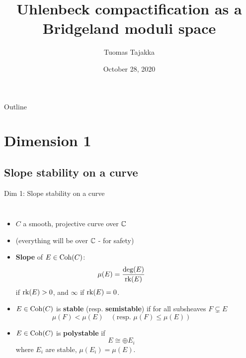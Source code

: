 \documentclass[8pt,handout]{beamer} %
\title{Uhlenbeck compactification as a Bridgeland moduli space}
\author{Tuomas Tajakka}
\institute{University of Washington}
\date{October 28, 2020}
\begin{document}
\begin{frame}
    \titlepage
\end{frame}

\begin{frame}{Outline}
    \tableofcontents    
\end{frame}

\section{Dimension 1}
\subsection{Slope stability on a curve}
\begin{frame}[fragile]{Dim 1: Slope stability on a curve}
\begin{columns}[t]
    \begin{itemize}
        \item<2-> $C$ a smooth, projective curve over $\mathbb{C}$
        \item<3-> (everything will be over $\mathbb{C}$ - for safety)
        \item<4-> \textbf{Slope} of $E \in \mathrm{Coh}(C)$:
        \[ \mu(E) = \frac{\deg(E)}{\operatorname{\mathrm{rk}}(E)} \]
        if $\operatorname{\mathrm{rk}}(E) > 0$, and $\infty$ if $\operatorname{\mathrm{rk}}(E) = 0$.
        \item<5-> $E \in \mathrm{Coh}(C)$ is \textbf{stable} (resp. \textbf{semistable}) if for all subsheaves $F \subsetneq E$
        \[ \mu(F) < \mu(E) \quad (\text{resp. } \mu(F) \le \mu(E)) \]
        \item<6-> $E \in \mathrm{Coh}(C)$ is \textbf{polystable} if
        \[ E \cong \oplus E_i \]
        where $E_i$ are stable, $\mu(E_i) = \mu(E)$.
    \end{itemize}
    

\end{columns}
\end{frame}
\end{document}
